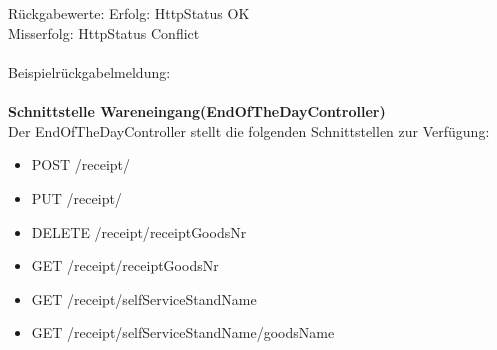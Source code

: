 \\
\\
Rückgabewerte: \tab 					Erfolg: HttpStatus OK\\
\tab \tab 								Misserfolg: HttpStatus Conflict\\
\\
Beispielrückgabelmeldung:	
\\
\\
\textbf{Schnittstelle Wareneingang(EndOfTheDayController)}
\\
Der EndOfTheDayController stellt die folgenden Schnittstellen zur Verfügung:

\begin{itemize}
	\itemsep0pt
	\item  POST /receipt/
	\item  PUT /receipt/
	\item  DELETE /receipt/{receiptGoodsNr}
	\item  GET /receipt/{receiptGoodsNr}
	\item  GET /receipt/{selfServiceStandName}
	\item  GET /receipt/{selfServiceStandName}/{goodsName}
\end{itemize}

